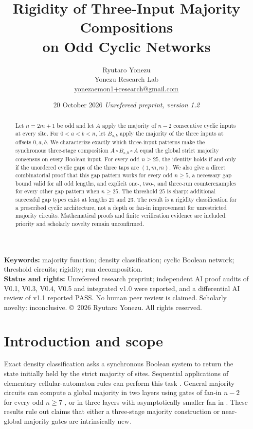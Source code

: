 \documentclass[11pt,a4paper]{article}
\title{\bfseries Rigidity of Three-Input Majority Compositions\\on Odd Cyclic Networks}
\author{Ryutaro Yonezu\\\small Yonezu Research Lab\\\small \href{mailto:yonezaemon1+research@gmail.com}{yonezaemon1+research@gmail.com}}
\date{20 October 2026 \quad\textit{Unrefereed preprint, version 1.2}}
\begin{document}
\maketitle
\begin{abstract}
Let $n=2m+1$ be odd and let $A$ apply the majority of $n-2$ consecutive cyclic inputs at every site. For $0<a<b<n$, let $B_{a,b}$ apply the majority of the three inputs at offsets $0,a,b$. We characterize exactly which three-input patterns make the synchronous three-stage composition $A\circ B_{a,b}\circ A$ equal the global strict majority consensus on every Boolean input. For every odd $n\ge25$, the identity holds if and only if the unordered cyclic gaps of the three taps are $(1,m,m)$. We also give a direct combinatorial proof that this gap pattern works for every odd $n\ge5$, a necessary gap bound valid for all odd lengths, and explicit one-, two-, and three-run counterexamples for every other gap pattern when $n\ge25$. The threshold $25$ is sharp: additional successful gap types exist at lengths $21$ and $23$. The result is a rigidity classification for a prescribed cyclic architecture, not a depth or fan-in improvement for unrestricted majority circuits. Mathematical proofs and finite verification evidence are included; priority and scholarly novelty remain unconfirmed.
\end{abstract}
\noindent\textbf{Keywords:} majority function; density classification; cyclic Boolean network; threshold circuits; rigidity; run decomposition.\\
\textbf{Status and rights:} Unrefereed research preprint; independent AI proof audits of V0.1, V0.3, V0.4, V0.5 and integrated v1.0 were reported, and a differential AI review of v1.1 reported PASS. No human peer review is claimed. Scholarly novelty: inconclusive. \copyright\ 2026 Ryutaro Yonezu. All rights reserved.

\section{Introduction and scope}
Exact density classification asks a synchronous Boolean system to return the state initially held by the strict majority of sites. Sequential applications of elementary cellular-automaton rules can perform this task \cite{fuks1997}. General majority circuits can compute a global majority in two layers using gates of fan-in $n-2$ for every odd $n\ge7$ \cite{amanoYoshida2018}, or in three layers with asymptotically smaller fan-in \cite{kulikovPodolskii2017}. These results rule out claims that either a three-stage majority construction or near-global majority gates are intrinsically new.
\end{document}
